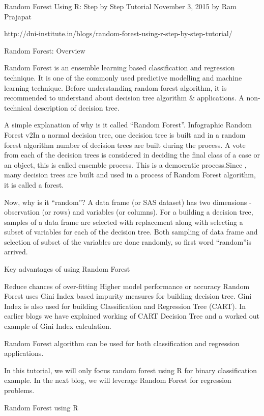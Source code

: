 Random Forest Using R: Step by Step Tutorial
November 3, 2015 by Ram Prajapat

http://dni-institute.in/blogs/random-forest-using-r-step-by-step-tutorial/


Random Forest: Overview

Random Forest is an ensemble learning  based classification and regression technique. It is one of the commonly used predictive modelling and machine learning technique. Before understanding random forest algorithm, it is recommended to understand about decision tree algorithm & applications. A non-technical description of decision tree.

A simple explanation of why is it called “Random Forest”.
Infographic Random Forest v2In a normal decision tree, one decision tree is built and in a random forest algorithm number of decision trees are built during the process. A vote from each of the decision trees is considered in deciding the final class of a case or an object, this is called ensemble process. This is a democratic process.Since , many decision trees are built and used in a process of Random Forest algorithm, it is called a forest.

Now, why is it “random”? A data frame (or SAS dataset) has two dimensions - observation (or rows) and variables (or columns). For a building a decision tree, samples of a data frame are selected with replacement along with selecting a subset of variables for each of the decision tree. Both sampling of data frame and selection of subset of the variables are done randomly, so first word “random”is arrived.

Key advantages of using Random Forest

Reduce chances of over-fitting
Higher model performance or accuracy
Random Forest uses Gini Index based impurity measures for building decision tree. Gini Index is also used for building Classification and Regression Tree (CART). In earlier blogs we have explained working of CART Decision Tree and a worked out example of Gini Index calculation.

Random Forest algorithm can be used for both classification and regression applications.

In this tutorial, we will only focus random forest using R for binary classification example. In the next blog, we will leverage Random Forest for regression problems.

Random Forest using R

